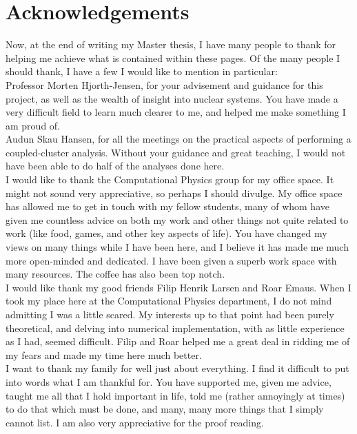 \documentclass[10pt,twoside]{report}
\begin{document}
	\chapter*{Acknowledgements}
	
	Now, at the end of writing my Master thesis, I have many people to thank for helping me achieve what is contained within these pages. Of the many people I should thank, I have a few I would like to mention in particular:\\
	
	Professor Morten Hjorth-Jensen, for your advisement and guidance for this project, as well as the wealth of insight into nuclear systems. You have made a very difficult field to learn much clearer to me, and helped me make something I am proud of. \\
	
	Audun Skau Hansen, for all the meetings on the practical aspects of performing a coupled-cluster analysis. Without your guidance and great teaching, I would not have been able to do half of the analyses done here.\\
	
	I would like to thank the Computational Physics group for my office space. It might not sound very appreciative, so perhaps I should divulge. My office space has allowed me to get in touch with my fellow students, many of whom have given me countless advice on both my work and other things not quite related to work (like food, games, and other key aspects of life). You have changed my views on many things while I have been here, and I believe it has made me much more open-minded and dedicated. I have been given a superb work space with many resources. The coffee has also been top notch.\\
	
	I would like thank my good friends Filip Henrik Larsen and Roar Emaus. When I took my place here at the Computational Physics department, I do not mind admitting I was a little scared. My interests up to that point had been purely theoretical, and delving into numerical implementation, with as little experience as I had, seemed difficult. Filip and Roar helped me  a great deal in ridding me of my fears and made my time here much better.\\
	
	I want to thank my family for well just about everything. I find it difficult to put into words what I am thankful for. You have supported me, given me advice, taught me all that I hold important in life, told me (rather annoyingly at times) to do that which must be done, and many, many more things that I simply cannot list. I am also very appreciative for the proof reading.\\
	
\end{document}
